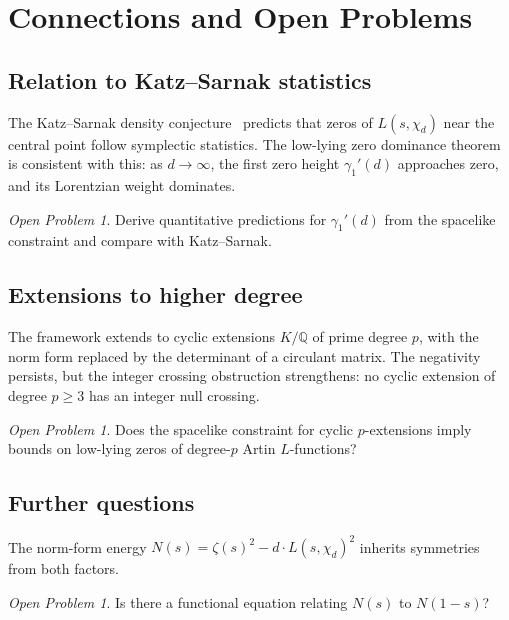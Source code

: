 \documentclass[12pt,reqno]{amsart}
\theoremstyle{plain}
\theoremstyle{definition}
\theoremstyle{remark}
\newtheorem{openproblem}[theorem]{Open Problem}
\newcommand{\Q}{\mathbb{Q}}
\begin{document}
\section{Connections and Open Problems}\label{sec:connections}

\subsection{Relation to Katz--Sarnak statistics}

The Katz--Sarnak density conjecture~\cite{KatzSarnak1999} predicts that zeros of $L(s, \chi_d)$ near the central point follow symplectic statistics. The low-lying zero dominance theorem is consistent with this: as $d \to \infty$, the first zero height $\gamma_1'(d)$ approaches zero, and its Lorentzian weight dominates.

\begin{openproblem}
Derive quantitative predictions for $\gamma_1'(d)$ from the spacelike constraint and compare with Katz--Sarnak.
\end{openproblem}

\subsection{Extensions to higher degree}

The framework extends to cyclic extensions $K/\Q$ of prime degree $p$, with the norm form replaced by the determinant of a circulant matrix. The negativity persists, but the integer crossing obstruction strengthens: no cyclic extension of degree $p \geq 3$ has an integer null crossing.

\begin{openproblem}
Does the spacelike constraint for cyclic $p$-extensions imply bounds on low-lying zeros of degree-$p$ Artin $L$-functions?
\end{openproblem}


\subsection{Further questions}

The norm-form energy $N(s) = \zeta(s)^2 - d \cdot L(s,\chi_d)^2$ inherits symmetries from both factors.

\begin{openproblem}
Is there a functional equation relating $N(s)$ to $N(1-s)$?
\end{openproblem}
\end{document}

